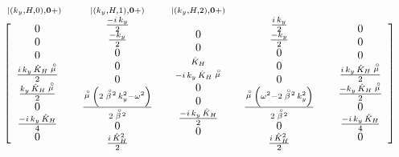 \begin{figure}
{\begin{minipage} {145.0mm}
\begin{samepage}
\begin{eqnarray}
\begin{array}{ccccc}
\scriptstyle|(k_y,H,0),{\bf 0}+)&
\scriptstyle|(k_y,H,1),{\bf 0}+)&\scriptstyle|(k_y,H,2),{\bf 0}+)\\
\left[\begin{array}{c} 0\\0\\0\\{i\,k_y\,{\hat{K}_{H}}\,\stackrel{\scriptscriptstyle _{\,\,\circ}}{ \mu}\over 2}\\
  {{k_y\,{\hat{K}_{H}}\,\stackrel{\scriptscriptstyle _{\,\,\circ}}{ \mu}}\over 2}\\0\\
  {{-i\,k_y\,{\hat{K}_{H}}}\over 4}\\0
\end{array}\right.&
\begin{array}{c} {{-i\,k_y}\over 2}\\
{{- k_y }\over 2}\\0\\
  0\\0\\{{\stackrel{\scriptscriptstyle _{\,\,\circ}}{ \mu}\,\left(2\, \stackrel{\scriptscriptstyle _{\,\,\circ}}{ \beta}{}^2\, k_y^2-{\omega^2}  \right) }\over { 2\, \stackrel{\scriptscriptstyle _{\,\,\circ}}{ \beta}{}^2} } 
  \\0\\{i\,{\hat{K}_{H}^2}\over 2}
\end{array}&
\begin{array}{c} 0\\0\\ \scriptstyle{\hat{K}_{H}}\\ \scriptstyle-i\,k_y\,{\hat{K}_{H}}\,\stackrel{\scriptscriptstyle _{\,\,\circ}}{ \mu}\\0\\0\\
  {{-i\,k_y\,{\hat{K}_{H}}}\over 2}\\0
\end{array}&
\begin{array}{c} {i\,k_y\over 2}\\{{- k_y }\over 2}\\0\\0\\0\\
  {{\stackrel{\scriptscriptstyle _{\,\,\circ}}{ \mu}\,\left({\omega^2}-2\, \stackrel{\scriptscriptstyle _{\,\,\circ}}{ \beta}{}^2\, k_y^2  \right) }\over { 2\, \stackrel{\scriptscriptstyle _{\,\,\circ}}{ \beta}{}^2} }\\
  0\\{i\,{\hat{K}_{H}^2}\over 2}
\end{array}&\left.
\begin{array}{c} 0\\0\\0\\{i\,k_y\,{\hat{K}_{H}}\,\stackrel{\scriptscriptstyle _{\,\,\circ}}{ \mu}\over 2}\\
  {{- k_y\,{\hat{K}_{H}}\,\stackrel{\scriptscriptstyle _{\,\,\circ}}{ \mu} }\over 2}\\0\\
  {{-i\,k_y\,{\hat{K}_{H}}}\over 4}\\0
\end{array}\right]
\end{array}\nonumber
\end{eqnarray}
\end{samepage}



\end{minipage}}
\end{figure}
